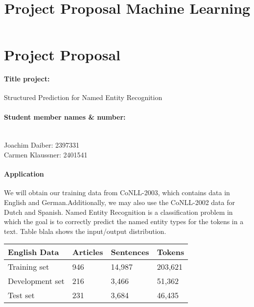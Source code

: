 \documentclass[a4paper,10pt]{article}
\title{Project Proposal Machine Learning}
\author{}
\date{}
\begin{document}
\maketitle

% 
% 


\section*{Project Proposal}

\paragraph{Title project:}
Structured Prediction for Named Entity Recognition

\paragraph{Student member names \& number:}\\
Joachim Daiber: 2397331\\
Carmen Klaussner: 2401541\\

\paragraph{Application}
We will obtain our training data from CoNLL-2003\cite{TjongKimSang:2003:ICS:1119176.1119195}, which contains
data in English and German.Additionally, we may also use the CoNLL-2002 data for Dutch and Spanish. 
Named Entity Recognition is a classification problem in which the goal is to correctly predict the named entity types for
the tokens in a text. Table blala shows the input/output distribution.



\begin{table}[h!]
\centering
 \begin{tabular}{l|l|l|l}
 \textbf{English Data}& Articles & Sentences & Tokens \\ \hline
 Training set &   946       &   14,987        &   203,621     \\
 Development set& 216        &  3,466         &    51,362     \\
 Test set       & 231        &   3,684        &     46,435    \\
  
 \end{tabular}
\end{table}
\end{document}
